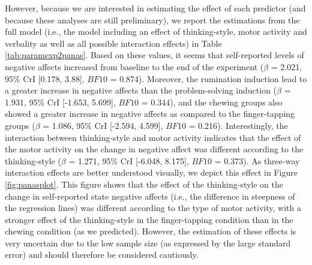 \documentclass[a4paper,12pt,twoside,openright,oldfontcommands]{memoir}
\begin{document}
However, because we are interested in estimating the effect of each predictor (and because these analyses are still preliminary), we report the estimations from the full model (i.e., the model including an effect of thinking-style, motor activity and verbality as well as all possible interaction effects) in Table \ref{tab:paramexp2panas}. Based on these values, it seems that self-reported levels of negative affects increased from baseline to the end of the experiment (\(\beta\) = 2.021, 95\% CrI {[}0.178, 3.88{]}, \(BF10\) = 0.874). Moreover, the rumination induction lead to a greater increase in negative affects than the problem-solving induction (\(\beta\) = 1.931, 95\% CrI {[}-1.653, 5.699{]}, \(BF10\) = 0.344), and the chewing groups also showed a greater increase in negative affects as compared to the finger-tapping groups (\(\beta\) = 1.086, 95\% CrI {[}-2.594, 4.599{]}, \(BF10\) = 0.216). Interestingly, the interaction between thinking-style and motor activity indicates that the effect of the motor activity on the change in negative affect was different according to the thinking-style (\(\beta\) = 1.271, 95\% CrI {[}-6.048, 8.175{]}, \(BF10\) = 0.373). As three-way interaction effects are better understood visually, we depict this effect in Figure \ref{fig:panasplot}. This figure shows that the effect of the thinking-style on the change in self-reported state negative affects (i.e., the difference in steepness of the regression lines) was different according to the type of motor activity, with a stronger effect of the thinking-style in the finger-tapping condition than in the chewing condition (as we predicted). However, the estimation of these effects is very uncertain due to the low sample size (as expressed by the large standard error) and should therefore be considered cautiously.
\end{document}
